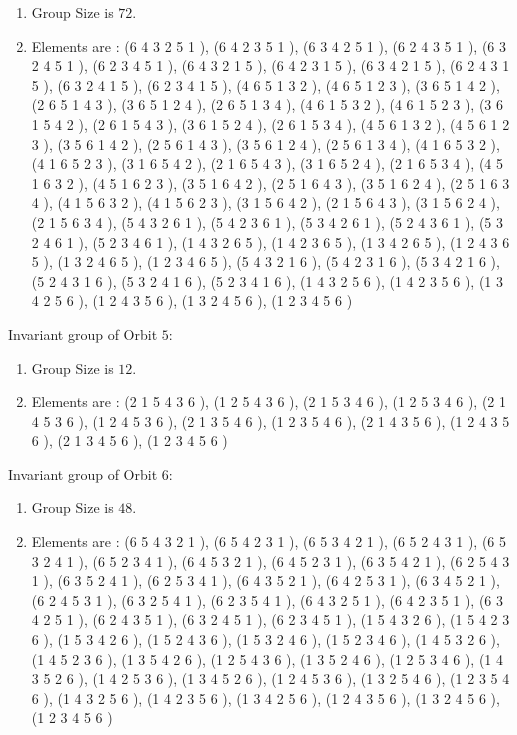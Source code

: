\documentclass[12pt]{article}
\begin{document}
\begin{enumerate}
\item Group Size is $72$.
\item Elements are : (6 4 3 2 5 1  ), (6 4 2 3 5 1  ), (6 3 4 2 5 1  ), (6 2 4 3 5 1  ), (6 3 2 4 5 1  ), (6 2 3 4 5 1  ), (6 4 3 2 1 5  ), (6 4 2 3 1 5  ), (6 3 4 2 1 5  ), (6 2 4 3 1 5  ), (6 3 2 4 1 5  ), (6 2 3 4 1 5  ), (4 6 5 1 3 2  ), (4 6 5 1 2 3  ), (3 6 5 1 4 2  ), (2 6 5 1 4 3  ), (3 6 5 1 2 4  ), (2 6 5 1 3 4  ), (4 6 1 5 3 2  ), (4 6 1 5 2 3  ), (3 6 1 5 4 2  ), (2 6 1 5 4 3  ), (3 6 1 5 2 4  ), (2 6 1 5 3 4  ), (4 5 6 1 3 2  ), (4 5 6 1 2 3  ), (3 5 6 1 4 2  ), (2 5 6 1 4 3  ), (3 5 6 1 2 4  ), (2 5 6 1 3 4  ), (4 1 6 5 3 2  ), (4 1 6 5 2 3  ), (3 1 6 5 4 2  ), (2 1 6 5 4 3  ), (3 1 6 5 2 4  ), (2 1 6 5 3 4  ), (4 5 1 6 3 2  ), (4 5 1 6 2 3  ), (3 5 1 6 4 2  ), (2 5 1 6 4 3  ), (3 5 1 6 2 4  ), (2 5 1 6 3 4  ), (4 1 5 6 3 2  ), (4 1 5 6 2 3  ), (3 1 5 6 4 2  ), (2 1 5 6 4 3  ), (3 1 5 6 2 4  ), (2 1 5 6 3 4  ), (5 4 3 2 6 1  ), (5 4 2 3 6 1  ), (5 3 4 2 6 1  ), (5 2 4 3 6 1  ), (5 3 2 4 6 1  ), (5 2 3 4 6 1  ), (1 4 3 2 6 5  ), (1 4 2 3 6 5  ), (1 3 4 2 6 5  ), (1 2 4 3 6 5  ), (1 3 2 4 6 5  ), (1 2 3 4 6 5  ), (5 4 3 2 1 6  ), (5 4 2 3 1 6  ), (5 3 4 2 1 6  ), (5 2 4 3 1 6  ), (5 3 2 4 1 6  ), (5 2 3 4 1 6  ), (1 4 3 2 5 6  ), (1 4 2 3 5 6  ), (1 3 4 2 5 6  ), (1 2 4 3 5 6  ), (1 3 2 4 5 6  ), (1 2 3 4 5 6  )
\end{enumerate}
Invariant group of Orbit $5$:
\begin{enumerate}
\item Group Size is $12$.
\item Elements are : (2 1 5 4 3 6  ), (1 2 5 4 3 6  ), (2 1 5 3 4 6  ), (1 2 5 3 4 6  ), (2 1 4 5 3 6  ), (1 2 4 5 3 6  ), (2 1 3 5 4 6  ), (1 2 3 5 4 6  ), (2 1 4 3 5 6  ), (1 2 4 3 5 6  ), (2 1 3 4 5 6  ), (1 2 3 4 5 6  )
\end{enumerate}
Invariant group of Orbit $6$:
\begin{enumerate}
\item Group Size is $48$.
\item Elements are : (6 5 4 3 2 1  ), (6 5 4 2 3 1  ), (6 5 3 4 2 1  ), (6 5 2 4 3 1  ), (6 5 3 2 4 1  ), (6 5 2 3 4 1  ), (6 4 5 3 2 1  ), (6 4 5 2 3 1  ), (6 3 5 4 2 1  ), (6 2 5 4 3 1  ), (6 3 5 2 4 1  ), (6 2 5 3 4 1  ), (6 4 3 5 2 1  ), (6 4 2 5 3 1  ), (6 3 4 5 2 1  ), (6 2 4 5 3 1  ), (6 3 2 5 4 1  ), (6 2 3 5 4 1  ), (6 4 3 2 5 1  ), (6 4 2 3 5 1  ), (6 3 4 2 5 1  ), (6 2 4 3 5 1  ), (6 3 2 4 5 1  ), (6 2 3 4 5 1  ), (1 5 4 3 2 6  ), (1 5 4 2 3 6  ), (1 5 3 4 2 6  ), (1 5 2 4 3 6  ), (1 5 3 2 4 6  ), (1 5 2 3 4 6  ), (1 4 5 3 2 6  ), (1 4 5 2 3 6  ), (1 3 5 4 2 6  ), (1 2 5 4 3 6  ), (1 3 5 2 4 6  ), (1 2 5 3 4 6  ), (1 4 3 5 2 6  ), (1 4 2 5 3 6  ), (1 3 4 5 2 6  ), (1 2 4 5 3 6  ), (1 3 2 5 4 6  ), (1 2 3 5 4 6  ), (1 4 3 2 5 6  ), (1 4 2 3 5 6  ), (1 3 4 2 5 6  ), (1 2 4 3 5 6  ), (1 3 2 4 5 6  ), (1 2 3 4 5 6  )
\end{enumerate}
\end{document}
